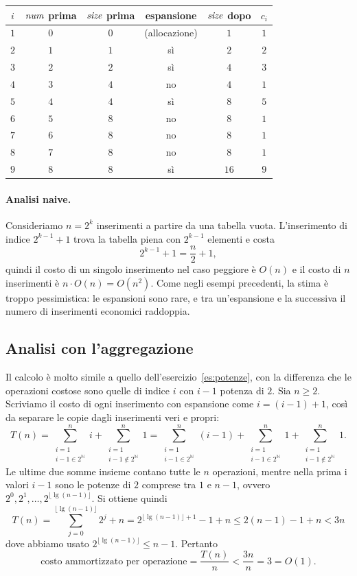 \begin{center}
\small
\begin{tabular}{cccccc}
\toprule
$i$ & $\mathit{num}$ prima & $\mathit{size}$ prima & espansione & $\mathit{size}$ dopo & $c_i$ \\
\midrule
$1$ & $0$ & $0$ & (allocazione) & $1$ & $1$ \\
$2$ & $1$ & $1$ & sì & $2$ & $2$ \\
$3$ & $2$ & $2$ & sì & $4$ & $3$ \\
$4$ & $3$ & $4$ & no & $4$ & $1$ \\
$5$ & $4$ & $4$ & sì & $8$ & $5$ \\
$6$ & $5$ & $8$ & no & $8$ & $1$ \\
$7$ & $6$ & $8$ & no & $8$ & $1$ \\
$8$ & $7$ & $8$ & no & $8$ & $1$ \\
$9$ & $8$ & $8$ & sì & $16$ & $9$ \\
\bottomrule
\end{tabular}
\end{center}

\paragraph{Analisi naive.}
Consideriamo $n = 2^k$ inserimenti a partire da una tabella vuota. L'inserimento di indice $2^{k-1}+1$ trova la tabella piena con $2^{k-1}$ elementi e costa
\[
2^{k-1} + 1 = \frac{n}{2} + 1,
\]
quindi il costo di un singolo inserimento nel caso peggiore è $O(n)$ e il costo di $n$ inserimenti è $n \cdot O(n) = O(n^2)$. Come negli esempi precedenti, la stima è troppo pessimistica: le espansioni sono rare, e tra un'espansione e la successiva il numero di inserimenti economici raddoppia.

\subsection{Analisi con l'aggregazione}
Il calcolo è molto simile a quello dell'esercizio~\ref{es:potenze}, con la differenza che le operazioni costose sono quelle di indice $i$ con $i-1$ potenza di $2$. Sia $n \ge 2$. Scriviamo il costo di ogni inserimento con espansione come $i = (i-1) + 1$, così da separare le copie dagli inserimenti veri e propri:
\[
T(n) = \sum_{\substack{i=1 \\ i-1 \in 2^{\mathbb{N}}}}^{n} i + \sum_{\substack{i=1 \\ i-1 \notin 2^{\mathbb{N}}}}^{n} 1 = \sum_{\substack{i=1 \\ i-1 \in 2^{\mathbb{N}}}}^{n} (i-1) + \sum_{\substack{i=1 \\ i-1 \in 2^{\mathbb{N}}}}^{n} 1 + \sum_{\substack{i=1 \\ i-1 \notin 2^{\mathbb{N}}}}^{n} 1.
\]
Le ultime due somme insieme contano tutte le $n$ operazioni, mentre nella prima i valori $i-1$ sono le potenze di $2$ comprese tra $1$ e $n-1$, ovvero $2^0, 2^1, \dots, 2^{\lfloor \lg(n-1) \rfloor}$. Si ottiene quindi
\[
T(n) = \sum_{j=0}^{\lfloor \lg(n-1) \rfloor} 2^j + n = 2^{\lfloor \lg(n-1) \rfloor + 1} - 1 + n \le 2(n-1) - 1 + n < 3n
\]
dove abbiamo usato $2^{\lfloor \lg(n-1) \rfloor} \le n-1$. Pertanto
\[
\text{costo ammortizzato per operazione} = \frac{T(n)}{n} < \frac{3n}{n} = 3 = O(1).
\]

